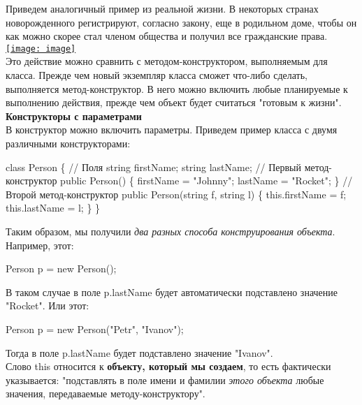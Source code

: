 \documentclass[12pt, a4paper]{article}
\begin{document}
Приведем аналогичный пример из реальной жизни. В некоторых странах новорожденного регистрируют, согласно закону, еще в родильном доме, чтобы он как можно скорее стал членом общества и получил все гражданские права.\\


\bigbreak \href{http://www.intuit.ru//EDI/25_09_16_1/1474755579-437/tutorial/590/objects/3/files/02-26.jpg}                         {\texttt{[image: image]}}\\



Это действие можно сравнить с методом-конструктором, выполняемым для класса. Прежде чем новый экземпляр класса сможет что-либо сделать, выполняется метод-конструктор. В него можно включить любые планируемые к выполнению действия, прежде чем объект будет считаться "готовым к жизни".\\

\textbf{Конструкторы с параметрами}\\

В конструктор можно включить параметры. Приведем пример класса с двумя различными конструкторами:\\

\begin{spverbatim}class Person
\{
  // Поля
  string firstName;
  string lastName;
  // Первый метод-конструктор
  public Person()
  \{
    firstName = "Johnny";
    lastName = "Rocket";
  \}
  // Второй метод-конструктор
  public Person(string f, string l)
  \{
    this.firstName = f;
    this.lastName = l;
  \}
\}\end{spverbatim}

Таким образом, мы получили \textit{два разных способа конструирования объекта}. Например, этот:\\

\begin{spverbatim}Person p = new Person();\end{spverbatim}

В таком случае в поле p.lastName  будет автоматически подставлено значение "Rocket". Или этот:\\

\begin{spverbatim}Person p = new Person("Petr", "Ivanov");\end{spverbatim}

Тогда в поле p.lastName  будет подставлено значение "Ivanov".\\

Слово this  относится к \textbf{объекту, который мы создаем}, то есть фактически указывается: "подставлять в поле имени и фамилии \textit{этого объекта}  любые значения, передаваемые методу-конструктору".\\
\end{document}
